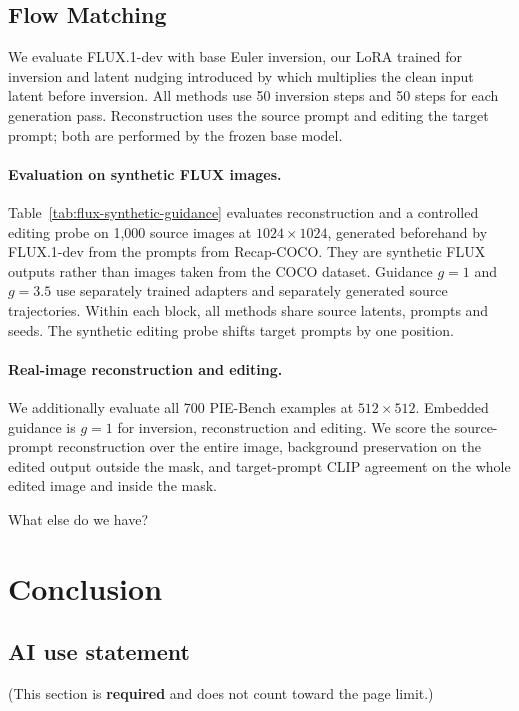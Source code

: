 \documentclass{article} %
\newcommand{\kamil}[1]{{\color{orange}#1}}
\begin{document}
\subsection{Flow Matching}
\label{sec:flux-experiments}

We evaluate FLUX.1-dev with base Euler inversion, our LoRA trained for inversion and latent nudging introduced by \citet{stableflow} which multiplies the clean input latent before inversion. All methods use 50 inversion steps and 50 steps for each generation pass. Reconstruction uses the source prompt and editing the target prompt; both are performed by the frozen base model.

\paragraph{Evaluation on synthetic FLUX images.}
Table~\ref{tab:flux-synthetic-guidance} evaluates reconstruction and a
controlled editing probe on 1,000 source images at $1024\times1024$, generated
beforehand by FLUX.1-dev from the prompts from Recap-COCO. They are synthetic FLUX
outputs rather than images taken from the COCO dataset. Guidance $g=1$ and $g=3.5$ use separately trained
adapters and separately generated source trajectories. Within each block,
all methods share source latents, prompts and seeds. The synthetic editing
probe shifts target prompts by one position.

\paragraph{Real-image reconstruction and editing.}
We additionally evaluate all 700 PIE-Bench examples at $512\times512$. Embedded guidance
is $g=1$ for inversion, reconstruction and editing. We score the
source-prompt reconstruction over the entire image, background preservation on
the edited output outside the mask, and target-prompt CLIP agreement on the whole edited image and inside the mask.

\kamil{What else do we have? }

\section{Conclusion}

\subsection*{AI use statement}

(This section is \textbf{required} and does not count toward the page limit.)
\end{document}
